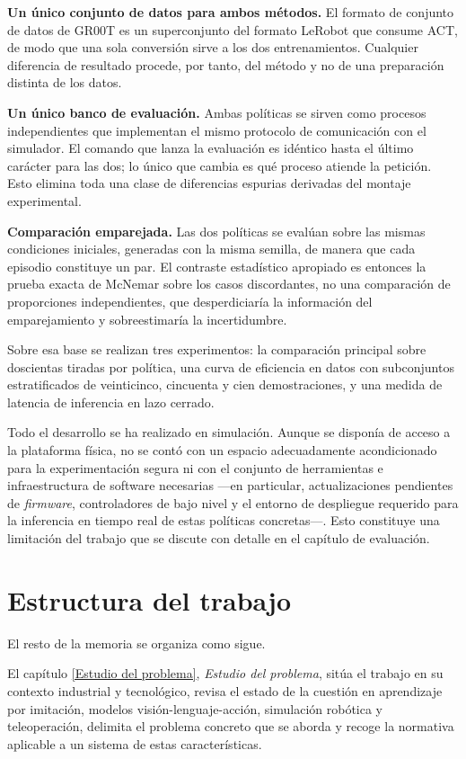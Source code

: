 \textbf{Un único conjunto de datos para ambos métodos.} El formato de conjunto de datos de GR00T es
un superconjunto del formato LeRobot que consume ACT, de modo que una sola conversión sirve a los
dos entrenamientos. Cualquier diferencia de resultado procede, por tanto, del método y no de una
preparación distinta de los datos.

\textbf{Un único banco de evaluación.} Ambas políticas se sirven como procesos independientes que
implementan el mismo protocolo de comunicación con el simulador. El comando que lanza la evaluación
es idéntico hasta el último carácter para las dos; lo único que cambia es qué proceso atiende la
petición. Esto elimina toda una clase de diferencias espurias derivadas del montaje experimental.

\textbf{Comparación emparejada.} Las dos políticas se evalúan sobre las mismas condiciones iniciales,
generadas con la misma semilla, de manera que cada episodio constituye un par. El contraste
estadístico apropiado es entonces la prueba exacta de McNemar sobre los casos discordantes, no una
comparación de proporciones independientes, que desperdiciaría la información del emparejamiento y
sobreestimaría la incertidumbre.

Sobre esa base se realizan tres experimentos: la comparación principal sobre doscientas tiradas por
política, una curva de eficiencia en datos con subconjuntos estratificados de veinticinco, cincuenta
y cien demostraciones, y una medida de latencia de inferencia en lazo cerrado.

Todo el desarrollo se ha realizado en simulación. Aunque se disponía de acceso a la plataforma física,
no se contó con un espacio adecuadamente acondicionado para la experimentación segura ni con el conjunto de
herramientas e infraestructura de software necesarias —en particular, actualizaciones pendientes de \textit{firmware},
controladores de bajo nivel y el entorno de despliegue requerido para la inferencia en tiempo real de estas
políticas concretas—. Esto constituye una limitación del trabajo que se discute con detalle en el capítulo
de evaluación.


\section*{Estructura del trabajo}

El resto de la memoria se organiza como sigue.

El capítulo \ref{Estudio del problema}, \textit{Estudio del problema}, sitúa el trabajo en su
contexto industrial y tecnológico, revisa el estado de la cuestión en aprendizaje por imitación,
modelos visión-lenguaje-acción, simulación robótica y teleoperación, delimita el problema concreto
que se aborda y recoge la normativa aplicable a un sistema de estas características.

